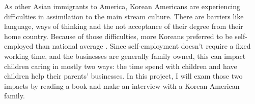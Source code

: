As other Asian immigrants to America, Korean Americans are
experiencing difficulties in assimilation to the main stream culture.
There are barriers like language, ways of thinking and the not acceptance of
their degree from their home country. Because of those difficulties, more
Koreans preferred to be self-employed than national
average \cite{online:SelfEmployed}. Since self-employment doesn't require a
fixed working time, and the businesses are generally family owned, this can impact
children caring in mostly two ways: the time spend with children and have
children help their parents' businesses. In this project, I will exam those
two impacts by reading a book and make an interview with a Korean American
family.
